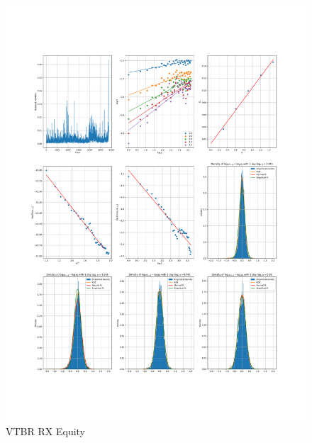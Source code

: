     \begin{figure}[h]
        \includegraphics[width=\textwidth]{fig/VTBR RX Equity.pdf}
        \caption{VTBR RX Equity}
    \end{figure} 
        
